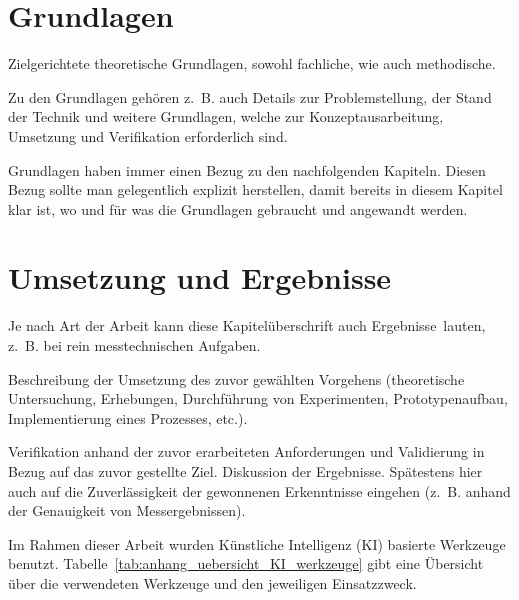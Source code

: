 \documentclass{scrbook} %
\begin{document}
\chapter{Grundlagen}
\label{cha:Grundlagen}

Zielgerichtete theoretische Grundlagen, sowohl fachliche, wie auch methodische.

Zu den Grundlagen gehören z.~B. auch Details zur Problemstellung, der Stand der Technik und weitere Grundlagen, welche zur Konzeptausarbeitung, Umsetzung und Verifikation erforderlich sind.

Grundlagen haben immer einen Bezug zu den nachfolgenden Kapiteln. Diesen Bezug sollte man gelegentlich explizit herstellen, damit bereits in diesem Kapitel klar ist, wo und für was die Grundlagen gebraucht und angewandt werden.

\chapter{Umsetzung und Ergebnisse}
\label{cha:umsetzung}

Je nach Art der Arbeit kann diese Kapitelüberschrift auch \glqq Ergebnisse\grqq~lauten, z.~B. bei rein messtechnischen Aufgaben.

Beschreibung der Umsetzung des zuvor gewählten Vorgehens (theoretische Untersuchung, Erhebungen, Durchführung von Experimenten, Prototypenaufbau, Implementierung eines Prozesses, etc.).

Verifikation anhand der zuvor erarbeiteten Anforderungen und Validierung in Bezug auf das zuvor gestellte Ziel. Diskussion der Ergebnisse. Spätestens hier auch auf die Zuverlässigkeit der gewonnenen Erkenntnisse eingehen (z.~B. anhand der Genauigkeit von Messergebnissen).

\setcounter{chapter}{1}

Im Rahmen dieser Arbeit wurden Künstliche Intelligenz (KI) basierte Werkzeuge benutzt. Tabelle~\ref{tab:anhang_uebersicht_KI_werkzeuge} gibt eine Übersicht über die verwendeten Werkzeuge und den jeweiligen Einsatzzweck.
\end{document}
